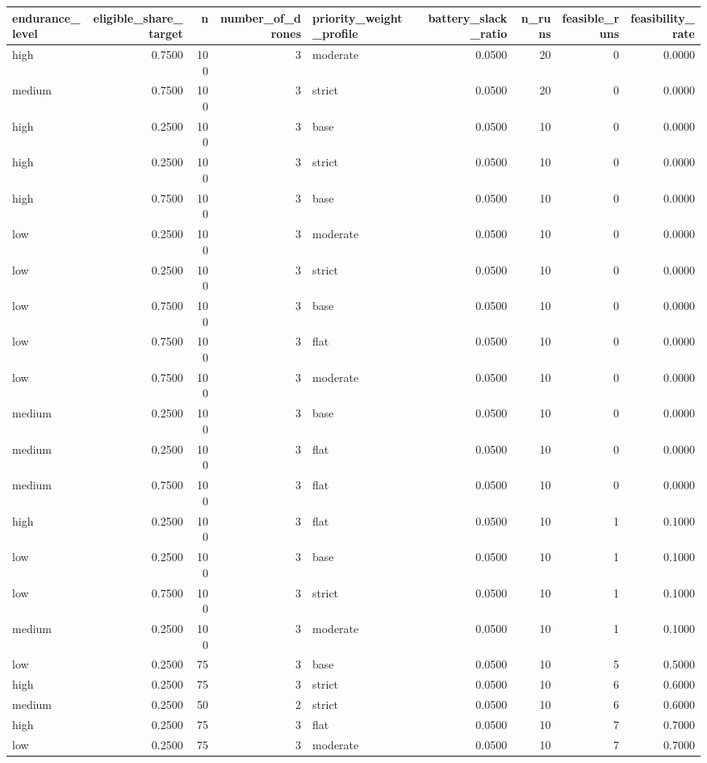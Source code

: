 \begin{tabular}{lrrrlrrrr}
\toprule
endurance_level & eligible_share_target & n & number_of_drones & priority_weight_profile & battery_slack_ratio & n_runs & feasible_runs & feasibility_rate \\
\midrule
high & 0.7500 & 100 & 3 & moderate & 0.0500 & 20 & 0 & 0.0000 \\
medium & 0.7500 & 100 & 3 & strict & 0.0500 & 20 & 0 & 0.0000 \\
high & 0.2500 & 100 & 3 & base & 0.0500 & 10 & 0 & 0.0000 \\
high & 0.2500 & 100 & 3 & strict & 0.0500 & 10 & 0 & 0.0000 \\
high & 0.7500 & 100 & 3 & base & 0.0500 & 10 & 0 & 0.0000 \\
low & 0.2500 & 100 & 3 & moderate & 0.0500 & 10 & 0 & 0.0000 \\
low & 0.2500 & 100 & 3 & strict & 0.0500 & 10 & 0 & 0.0000 \\
low & 0.7500 & 100 & 3 & base & 0.0500 & 10 & 0 & 0.0000 \\
low & 0.7500 & 100 & 3 & flat & 0.0500 & 10 & 0 & 0.0000 \\
low & 0.7500 & 100 & 3 & moderate & 0.0500 & 10 & 0 & 0.0000 \\
medium & 0.2500 & 100 & 3 & base & 0.0500 & 10 & 0 & 0.0000 \\
medium & 0.2500 & 100 & 3 & flat & 0.0500 & 10 & 0 & 0.0000 \\
medium & 0.7500 & 100 & 3 & flat & 0.0500 & 10 & 0 & 0.0000 \\
high & 0.2500 & 100 & 3 & flat & 0.0500 & 10 & 1 & 0.1000 \\
low & 0.2500 & 100 & 3 & base & 0.0500 & 10 & 1 & 0.1000 \\
low & 0.7500 & 100 & 3 & strict & 0.0500 & 10 & 1 & 0.1000 \\
medium & 0.2500 & 100 & 3 & moderate & 0.0500 & 10 & 1 & 0.1000 \\
low & 0.2500 & 75 & 3 & base & 0.0500 & 10 & 5 & 0.5000 \\
high & 0.2500 & 75 & 3 & strict & 0.0500 & 10 & 6 & 0.6000 \\
medium & 0.2500 & 50 & 2 & strict & 0.0500 & 10 & 6 & 0.6000 \\
high & 0.2500 & 75 & 3 & flat & 0.0500 & 10 & 7 & 0.7000 \\
low & 0.2500 & 75 & 3 & moderate & 0.0500 & 10 & 7 & 0.7000 \\

\end{tabular}

